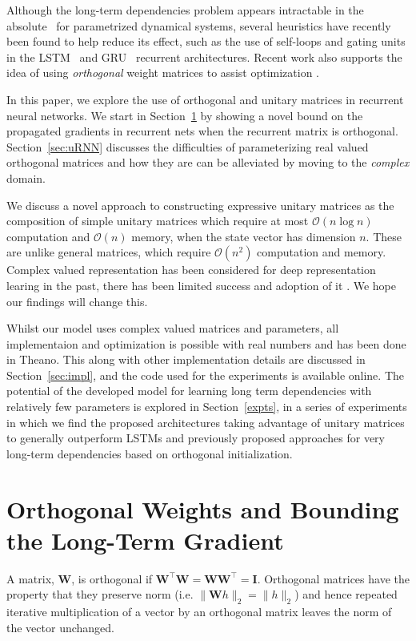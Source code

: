 \documentclass{article} %
\newcommand{\matr}[1]{\mathbf{#1}}
\begin{document}
Although the long-term dependencies problem appears intractable in the absolute~\citep{Yoshua94} for
parametrized dynamical systems, several heuristics have recently been found to help 
reduce its effect, such as the use of self-loops and gating units in the LSTM~\citep{LSTM}
and GRU~\citep{Cho2014a} recurrent architectures.
Recent work also supports the idea of using \textit{orthogonal} weight matrices to assist optimization  
\citep{Saxe2014, Quoc2015}.


In this paper, we explore the use of orthogonal and unitary matrices in recurrent neural networks.
We start in Section~\ref{sec:ortho} by showing a novel bound on the propagated gradients
in recurrent nets when the recurrent matrix is orthogonal.
Section~\ref{sec:uRNN} discusses the difficulties of parameterizing real valued orthogonal matrices and how
they are can be alleviated by moving to the \textit{complex} domain. 

We discuss a novel approach to constructing expressive unitary matrices as the composition of simple
unitary matrices which require at most $\mathcal{O}(n \log n)$ computation and $\mathcal{O}(n)$ memory,
when the state vector has dimension $n$. These are
unlike general matrices, which require $\mathcal{O}(n^2)$ computation and memory. 
Complex valued representation has been considered for deep representation learing in the past, 
there has been limited success and adoption of it \citep{hirose2003complex, zimmermann2011comparison}. 
We hope our findings will change this.

Whilst our model uses complex valued matrices and parameters, all
implementaion and optimization is possible with real numbers and has been
done in Theano. This along with other implementation details are discussed
in Section~\ref{sec:impl}, and the code used for the experiments is available online.
The potential of the developed model for learning long term dependencies
with relatively few parameters is explored in Section~\ref{expts}, in a series of
experiments in which we find the proposed architectures taking advantage of
unitary matrices to generally outperform LSTMs and previously proposed
approaches for very long-term dependencies based on orthogonal
initialization.

\section{Orthogonal Weights and Bounding the Long-Term Gradient}
\label{sec:ortho}

A matrix, $\matr{W}$, is orthogonal if 
$\matr{W}^\top \matr{W} = \matr{W} \matr{W}^\top = \matr{I}$. 
Orthogonal matrices have the property that they preserve norm (i.e. $\| \matr{W} h \|_2 = \| h \|_2$)
and hence repeated iterative multiplication of a vector by an orthogonal matrix leaves the norm of the 
vector unchanged.
\end{document}
